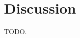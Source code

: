 \documentclass[12pt, twoside]{article}
\begin{document}
\section{Discussion}

TODO.




\end{document}
